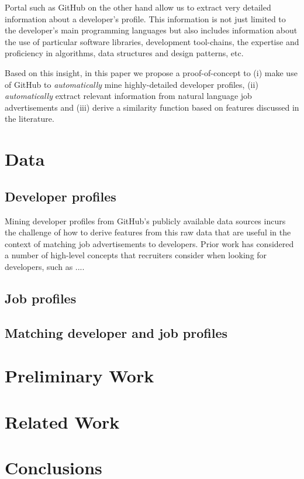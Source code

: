 \documentclass[conference]{IEEEtran}
\begin{document}
Portal such as GitHub on the other hand allow us to extract very detailed information about a developer's profile. This information is not just limited to the developer's main programming languages but also includes information about the use of particular software libraries, development tool-chains, the expertise and proficiency in algorithms, data structures and design patterns, etc.

Based on this insight, in this paper we propose a proof-of-concept to (i) make use of GitHub to \emph{automatically} mine highly-detailed developer profiles, (ii) \emph{automatically} extract relevant information from natural language job advertisements and (iii) derive a similarity function based on features discussed in the literature. 


\section{Data}

\subsection{Developer profiles}

Mining developer profiles from GitHub's publicly available data sources incurs the challenge of how to derive features from this raw data that are useful in the context of matching job advertisements to developers. Prior work has considered a number of high-level concepts that recruiters consider when looking for developers, such as ....

\subsection{Job profiles}

\subsection{Matching developer and job profiles}


\section{Preliminary Work}

\section{Related Work}

\section{Conclusions}



\end{document}
